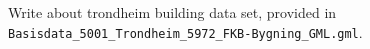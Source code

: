 Write about trondheim building data set, provided in \\
\texttt{Basisdata\_5001\_Trondheim\_5972\_FKB-Bygning\_GML.gml}.
